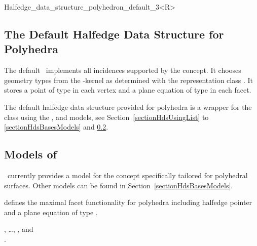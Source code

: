 \begin{ccClassTemplate}{Halfedge_data_structure_polyhedron_default_3<R>}
\subsection{The Default Halfedge Data Structure for Polyhedra}
\label{sectionPolyHdsDefault}


\ccDefinition

The default \ccClassTemplateName\ implements all incidences supported
by the  concept. It chooses geometry
types from the \cgal-kernel as determined with the representation
class . It stores a point of type  in each
vertex and a plane equation of type  in each facet.


\ccImplementation

The default halfedge data structure provided for polyhedra is a wrapper for
the class  using the
,
 and 
models, see Section~\ref{sectionHdsUsingList} to
\ref{sectionHdsBasesModels} and \ref{sectionPolyHdsBases}.

\end{ccClassTemplate}

\subsection{Models of \protect{}}
\label{sectionPolyHdsBases}

\cgal\ currently provides a model for the  concept
specifically tailored for polyhedral surfaces. Other models can be found
in Section~\ref{sectionHdsBasesModels}.


    {defines the maximal facet functionality for polyhedra including
     halfedge pointer and a plane equation of type .}

\ccSeeAlso

, \ldots, , and\\
.



